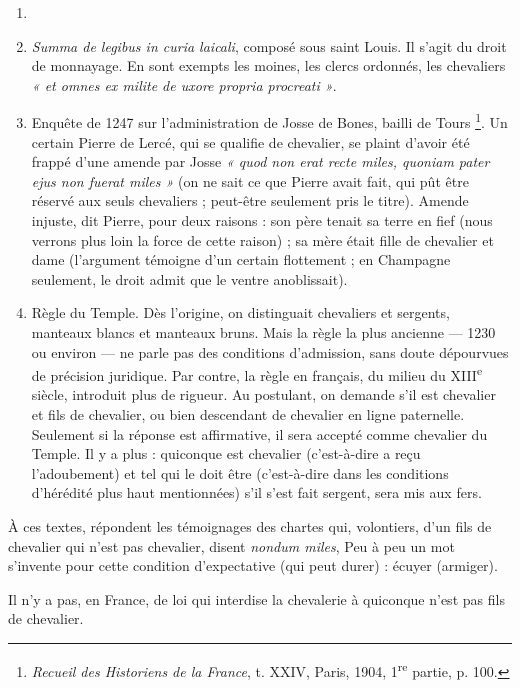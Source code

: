 \documentclass[french,twoside]{book} %
\begin{document}
\begin{enumerate}[itemsep=0pt,]
\item[] \hspace{-1.5em}{\bfseries Ici, quelques textes peuvent nous servir utilement de points de repère :}
\item {\itshape Summa de legibus in curia laicali}, composé sous saint Louis. Il s’agit du droit de monnayage. En sont exempts les moines, les clercs ordonnés, les chevaliers \emph{« et omnes ex milite de uxore propria procreati »}.
\item Enquête de 1247 sur l’administration de Josse de Bones, bailli de Tours \footnote{{\itshape Recueil des Historiens de la France}, t. XXIV, Paris, 1904, 1\textsuperscript{re} partie, p. 100.}. Un certain Pierre de Lercé, qui se qualifie de chevalier, se plaint d’avoir été frappé d’une amende par Josse \emph{« quod non erat recte miles, quoniam pater ejus non fuerat miles »} (on ne sait ce que Pierre avait fait, qui pût être réservé aux seuls chevaliers ; peut-être seulement pris le titre). Amende injuste, dit Pierre, pour deux raisons : son père tenait sa terre en fief (nous verrons plus loin la force de cette raison) ; sa mère était fille de chevalier et dame (l’argument témoigne d’un certain flottement ; en Champagne seulement, le droit admit que le ventre anoblissait).
\item Règle du Temple. Dès l’origine, on distinguait chevaliers et sergents, manteaux blancs et manteaux bruns. Mais la règle la plus ancienne — 1230 ou environ — ne parle pas des conditions d’admission, sans doute dépourvues de précision juridique. Par contre, la règle en français, du milieu du XIII\textsuperscript{e} siècle, introduit plus de rigueur. Au postulant, on demande s’il est chevalier et fils de chevalier, ou bien descendant de chevalier en ligne paternelle. Seulement si la réponse est affirmative, il sera accepté comme chevalier du Temple. Il y a plus : quiconque est chevalier (c’est-à-dire a reçu l’adoubement) et tel qui le doit être (c’est-à-dire dans les conditions d’hérédité plus haut mentionnées) s’il s’est fait sergent, sera mis aux fers.

\end{enumerate}\noindent À ces textes, répondent les témoignages des chartes qui, volontiers, d’un fils de chevalier qui n’est pas chevalier, disent \emph{nondum miles}, Peu à peu un mot s’invente pour cette condition d’expectative (qui peut durer) : écuyer (armiger).\par
Il n’y a pas, en France, de loi qui interdise la chevalerie à quiconque n’est pas fils de chevalier.\par
\end{document}
